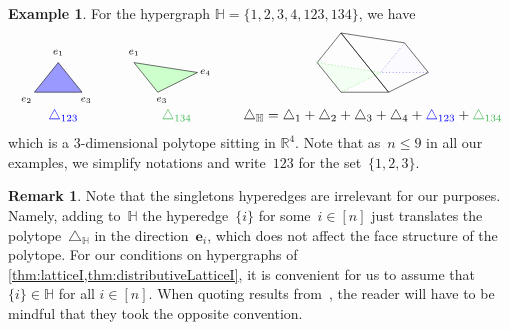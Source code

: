 \documentclass[reqno]{amsart}
\theoremstyle{definition}
\newtheorem{example}[theorem]{Example}
\newtheorem{remark}[theorem]{Remark}
\newcommand{\R}{\mathbb{R}} %
\renewcommand{\b}[1]{\boldsymbol{#1}} %
\newcommand{\simplex}{\triangle} %
\newcommand{\blue}[1]{{\color{blue} #1}} %
\newcommand{\green}[1]{{\color{darkgreen} #1}} %
\newcommand{\HH}{\mathbb H}  %
\begin{document}
\begin{example}
\label{ex:DH1}
For the hypergraph $\HH=\{ 1, 2, 3, 4, 123, 134 \}$,
we  have
\[
\begin{array}{ccc}
 \begin{tikzpicture}[scale=1,baseline=.5cm]
	\node (1) at (0.6,1.0) {$\scriptstyle e_1$};
	\node (2) at (-.2,-.2) {$\scriptstyle e_2$};
	\node (3) at (1.3,-.2) {$\scriptstyle e_3$};
	\draw [fill=blue!40] (0,0) -- (.6,.75) -- (1.2,0) --(0,0) ;   %
\end{tikzpicture} \quad &
 \begin{tikzpicture}[scale=1,baseline=.5cm]
	\node (1) at (0.6,1.0) {$\scriptstyle e_1$};
	\node at (1.3,-.2) {$\scriptstyle e_3$};
	\node at (2.4,.5) {$\scriptstyle e_4$};
	\draw [fill=green!20] (1.2,0) -- (2.2,.5 )--(.6,.75)--(1.2,0); %
\end{tikzpicture} \quad &
\begin{tikzpicture}[scale=1,baseline=.5cm]
	\draw [color=gray!10,fill=blue!2] (1.6,1.25)--(1,.5)--(2.2,.5)-- (1.6,1.25); 
	\draw [color=gray!10,fill=green!5]  (0,0)--(1,.5)--(-.6,.75)--(0,0);
	\draw [dotted,color=green] (0,0)--(1,.5)--(-.6,.75);
	\draw [dotted,color=blue] (1.6,1.25)--(1,.5)--(2.2,.5);
	\draw (0,1.5)-- (1.6,1.25) -- (2.2,.5) -- (1.2,0) --(0,1.5) ; 
	\draw (0,0)--(-.6,.75)--(0,1.5)-- (1.2,0) --(0,0); 
\end{tikzpicture}\\
\blue{\simplex_{123}}& \green{\simplex_{134}} & \simplex_\HH = \simplex_1 + \simplex_2 + \simplex_3 + \simplex_4 + \blue{\simplex_{123}} + \green{\simplex_{134}}\\
\end{array}
\]
which is a 3-dimensional polytope sitting in $\R^4$.
Note that as~$n \le 9$ in all our examples, we simplify notations and write~$123$ for the set~$\{1,2,3\}$.
\end{example}

\begin{remark}
\label{rem:single}
Note that the singletons hyperedges are irrelevant for our purposes.
Namely, adding to~$\HH$ the hyperedge~$\{i\}$ for some~$i \in [n]$ just translates the polytope~$\simplex_\HH$ in the direction~$\b{e}_i$, which does not affect the face structure of the polytope.
For our conditions on hypergraphs of \cref{thm:latticeI,thm:distributiveLatticeI}, it is convenient for us to assume that $\{i\} \in \HH$ for all $i \in [n]$.
When quoting results from~\cite{BenedettiBergeronMachacek}, the reader will have to be mindful that they took the opposite convention.
\end{remark}
\end{document}
